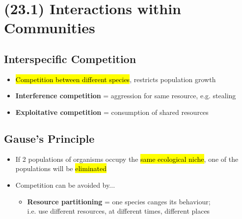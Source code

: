 \documentclass[a4paper,12pt]{article}
\begin{document}
\section{(23.1) Interactions within Communities}
\subsection{Interspecific Competition}
\begin{itemize}
    \item{\hl{Competition between different species}, restricts population growth}
    \item{\textbf{Interference competition} = aggression for same resource, e.g. stealing}
    \item{\textbf{Exploitative competition} = consumption of shared resources}
\end{itemize}

\subsection{Gause's Principle}
\begin{itemize}
    \item{If 2 populations of organisms occupy the \hl{same ecological niche}, one of the populations will be \hl{eliminated}}
    \item{
            Competition can be avoided by...
            \begin{itemize}
                \item{\textbf{Resource partitioning} = one species canges its behaviour; \\ i.e. use different resources, at different times, different places}
            \end{itemize}
        }
\end{itemize}
\end{document}
